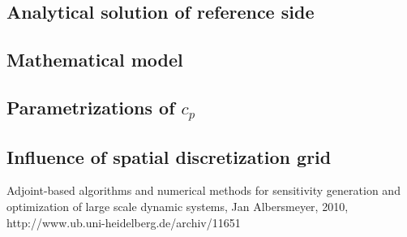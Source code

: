 \documentclass{scrartcl}[12pt, halfparskip]
\begin{document}
\subsection{Analytical solution of reference side}
\subsection{Mathematical model}
\subsection{Parametrizations of $c_p$}
\subsection{Influence of spatial discretization grid}




\begin{thebibliography}{9}

	 Adjoint-based algorithms and numerical methods for sensitivity generation and optimization of large scale dynamic systems, 
	 Jan Albersmeyer, 2010,
	 http://www.ub.uni-heidelberg.de/archiv/11651

  
\end{thebibliography}
\end{document}
